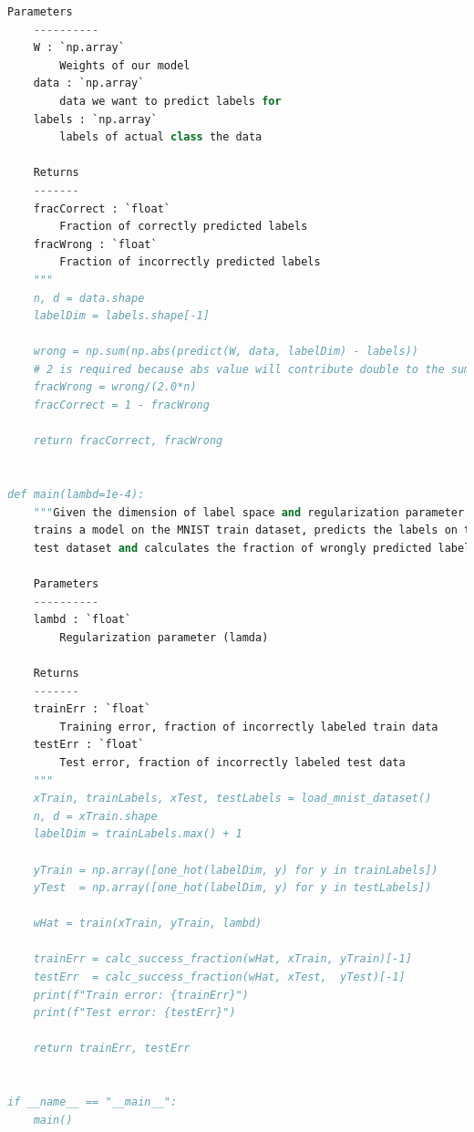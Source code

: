 \documentclass{article}
\newcommand{\1}{\mathbf{1}}
\begin{document}
\begin{enumerate}
\begin{lstlisting}[language=Python]
    Parameters
    ----------
    W : `np.array`
        Weights of our model
    data : `np.array`
        data we want to predict labels for
    labels : `np.array`
        labels of actual class the data

    Returns
    -------
    fracCorrect : `float`
        Fraction of correctly predicted labels
    fracWrong : `float`
        Fraction of incorrectly predicted labels 
    """
    n, d = data.shape
    labelDim = labels.shape[-1]

    wrong = np.sum(np.abs(predict(W, data, labelDim) - labels))
    # 2 is required because abs value will contribute double to the sum
    fracWrong = wrong/(2.0*n)
    fracCorrect = 1 - fracWrong

    return fracCorrect, fracWrong


def main(lambd=1e-4):
    """Given the dimension of label space and regularization parameter value
    trains a model on the MNIST train dataset, predicts the labels on the MNIST
    test dataset and calculates the fraction of wrongly predicted labels.

    Parameters
    ----------
    lambd : `float`
        Regularization parameter (lamda)

    Returns
    -------
    trainErr : `float`
        Training error, fraction of incorrectly labeled train data
    testErr : `float`
        Test error, fraction of incorrectly labeled test data
    """
    xTrain, trainLabels, xTest, testLabels = load_mnist_dataset()
    n, d = xTrain.shape
    labelDim = trainLabels.max() + 1 

    yTrain = np.array([one_hot(labelDim, y) for y in trainLabels])
    yTest  = np.array([one_hot(labelDim, y) for y in testLabels])

    wHat = train(xTrain, yTrain, lambd)

    trainErr = calc_success_fraction(wHat, xTrain, yTrain)[-1]
    testErr  = calc_success_fraction(wHat, xTest,  yTest)[-1]
    print(f"Train error: {trainErr}")
    print(f"Test error: {testErr}")

    return trainErr, testErr


if __name__ == "__main__":
    main()
\end{lstlisting}
    
    
    
\end{enumerate}{}



\newpage
\end{document}
